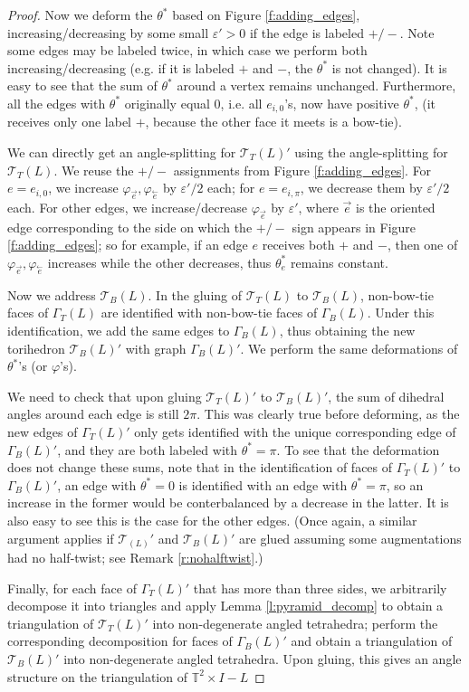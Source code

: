 \documentclass[11pt]{amsart}
\newcommand{\lemref}[1]{Lemma \ref{#1}}
\newcommand{\remref}[1]{Remark \ref{#1}}
\newcommand{\torus}{{\mathbb{T}^2}}
\newcommand{\sT}{{\mathcal{T}}}
\newcommand{\cev}[1]{\overset{\leftarrow}{#1}}
\newcommand{\vphi}{\varphi}
\newcommand{\veps}{\varepsilon}
\newcommand{\toruscomp}[1]{{\torus \times I - #1}}
\theoremstyle{plain}
\theoremstyle{definition}
\begin{document}
\begin{proof}
Now we deform the $\theta^*$ based on Figure \ref{f:adding_edges},
increasing/decreasing by some small $\veps' > 0$ if the edge
is labeled $+/-$.
Note some edges may be labeled twice, in which case we perform
both increasing/decreasing (e.g. if it is labeled $+$ and $-$,
the $\theta^*$ is not changed).
It is easy to see that the sum of $\theta^*$ around a vertex
remains unchanged.
Furthermore, all the edges with $\theta^*$ originally equal 0,
i.e. all $e_{i,0}$'s,
now have positive $\theta^*$,
(it receives only one label $+$,
because the other face it meets is a bow-tie).



We can directly get an angle-splitting for $\sT_T(L)'$
using the angle-splitting for $\sT_T(L)$.
We reuse the $+/-$ assignments from Figure \ref{f:adding_edges}.
For $e = e_{i,0}$, we increase $\vphi_{\vec{e}}, \vphi_{\cev{e}}$
by $\veps'/2$ each; for $e = e_{i,\pi}$,
we decrease them by $\veps'/2$ each.
For other edges, we increase/decrease $\vphi_{\vec{e}}$ by $\veps'$,
where $\vec{e}$ is the oriented edge corresponding to the side
on which the $+/-$ sign appears in Figure \ref{f:adding_edges};
so for example, if an edge $e$ receives both $+$ and $-$,
then one of $\vphi_{\vec{e}},\vphi_{\cev{e}}$ increases
while the other decreases, thus $\theta_e^*$ remains constant.


Now we address $\sT_B(L)$.
In the gluing of $\sT_T(L)$ to $\sT_B(L)$,
non-bow-tie faces of $\Gamma_T(L)$ are identified with
non-bow-tie faces of $\Gamma_B(L)$.
Under this identification, we add the same edges to $\Gamma_B(L)$,
thus obtaining the new torihedron $\sT_B(L)'$ with graph
$\Gamma_B(L)'$.
We perform the same deformations of $\theta^*$'s (or $\vphi$'s).


We need to check that upon gluing $\sT_T(L)'$ to $\sT_B(L)'$,
the sum of dihedral angles around each edge is still $2\pi$.
This was clearly true before deforming, as the new edges of
$\Gamma_T(L)'$ only gets identified with the unique
corresponding edge of $\Gamma_B(L)'$, and they are both labeled
with $\theta^* = \pi$.
To see that the deformation does not change these sums,
note that in the identification of faces of $\Gamma_T(L)'$
to $\Gamma_B(L)'$,
an edge with $\theta^*=0$ is identified with an edge with
$\theta^*=\pi$,
so an increase in the former would be conterbalanced by
a decrease in the latter.
It is also easy to see this is the case for the other edges.
(Once again, a similar argument applies if $\sT_(L)'$
and $\sT_B(L)'$ are glued assuming
some augmentations had no half-twist; see \remref{r:nohalftwist}.)


Finally, for each face of $\Gamma_T(L)'$ that has more than three sides,
we arbitrarily decompose it into triangles
and apply \lemref{l:pyramid_decomp}
to obtain a triangulation of $\sT_T(L)'$ into non-degenerate angled tetrahedra;
perform the corresponding decomposition for faces of
$\Gamma_B(L)'$ and obtain a triangulation of $\sT_B(L)'$
into non-degenerate angled tetrahedra.
Upon gluing, this gives an angle structure on the triangulation
of $\toruscomp{L}$
\end{proof}
\end{document}
